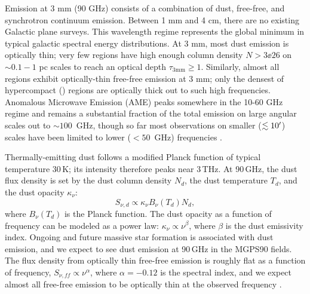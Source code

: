 \documentclass[twocolumn]{aastex62}
\def\todo#1{{\textcolor{red}{TODO: #1}}}
\begin{document}
Emission at 3 mm (90 GHz) consists of a combination of dust, free-free, and synchrotron continuum emission. 
Between 1 mm and 4 cm, there are no existing Galactic plane surveys.  This wavelength
regime represents the global minimum in typical galactic spectral energy
distributions.  At 3 mm, most dust emission is optically thin; very few regions
have high enough column density $N>3\ee{26}$ \persc on $\sim0.1-1$ pc scales to reach an optical
depth $\tau_{3 \mathrm{mm}}\geq1$.  Similarly, almost all \hii regions exhibit
optically-thin free-free emission  at 3 mm; only the densest of hypercompact
\hii (\hchii) regions are optically thick out to such high frequencies.
Anomalous Microwave Emission (AME) peaks somewhere in the 10-60 GHz
regime and remains a substantial fraction of the total emission on large angular scales out to
$\sim100$~GHz, though so far most observations on smaller ($\lesssim10\mbox{$^\prime$}$) scales have
been limited to lower ($<50$~GHz) frequencies  \citep{Dickinson2018a}.


Thermally-emitting dust follows a modified Planck function of typical temperature
30\,K; its intensity therefore peaks near 3\,THz.  At 90\,GHz, the dust flux
density is set by the dust column density $N_d$, the dust temperature $T_d$,
and the dust opacity $\kappa_\nu$:
\begin{equation}
    S_{\nu, d} \propto \kappa_\nu B_\nu(T_d) N_d,
    \label{eq:dust}
\end{equation}
where $B_\nu(T_d)$ is the Planck function.  The dust opacity as a function of
frequency can be modeled as a power law: $\kappa_\nu \propto \nu^{\beta}$,
where $\beta$ is the dust emissivity index.
Ongoing and future massive star formation is associated with dust emission, and
we expect to see dust emission at 90\,GHz in the MGPS90 fields.  
The flux density from optically thin free-free emission is roughly flat as a
function of frequency, $S_{\nu, ff} \propto \nu^{\alpha}$, where $\alpha=-0.12$
is the spectral index, and we expect almost
all free-free emission to be optically thin at the observed frequency
\citep{Wilson2009a,Condon2007a,Condon2016a}. 
\end{document}
